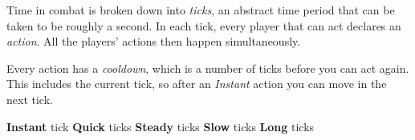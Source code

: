 
Time in combat is broken down into \emph{ticks}, an abstract time period that can be taken to be roughly a second. In each tick, every player that can act declares an \emph{action}. All the players' actions then happen simultaneously.

Every action has a \emph{cooldown}, which is a number of ticks before you can act again. This includes the current tick, so after an \emph{Instant} action you can move in the next tick.

{\footnotesize
  \textbf{Instant}  tick  \hfill
  \textbf{Quick}    ticks \hfill
  \textbf{Steady}   ticks \hfill
  \textbf{Slow}     ticks \hfill
  \textbf{Long}     ticks \hspace*{-5ex} %
}
